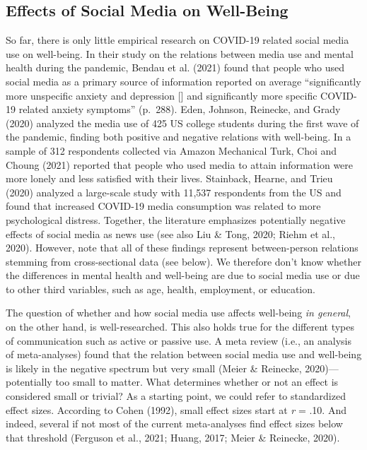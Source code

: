 \documentclass[
  english,
  man,floatsintext]{apa6}
\begin{document}
\hypertarget{effects-of-social-media-on-well-being}{%
\subsection{Effects of Social Media on Well-Being}\label{effects-of-social-media-on-well-being}}

So far, there is only little empirical research on COVID-19 related social media use on well-being.
In their study on the relations between media use and mental health during the pandemic, Bendau et al. (2021) found that people who used social media as a primary source of information reported on average ``significantly more unspecific anxiety and depression {[}{]} and significantly more specific COVID-19 related anxiety symptoms'' (p.~288).
Eden, Johnson, Reinecke, and Grady (2020) analyzed the media use of 425 US college students during the first wave of the pandemic, finding both positive and negative relations with well-being.
In a sample of 312 respondents collected via Amazon Mechanical Turk, Choi and Choung (2021) reported that people who used media to attain information were more lonely and less satisfied with their lives.
Stainback, Hearne, and Trieu (2020) analyzed a large-scale study with 11,537 respondents from the US and found that increased COVID-19 media consumption was related to more psychological distress.
Together, the literature emphasizes potentially negative effects of social media as news use (see also Liu \& Tong, 2020; Riehm et al., 2020).
However, note that all of these findings represent between-person relations stemming from cross-sectional data (see below).
We therefore don't know whether the differences in mental health and well-being are due to social media use or due to other third variables, such as age, health, employment, or education.

The question of whether and how social media use affects well-being \emph{in general}, on the other hand, is well-researched.
This also holds true for the different types of communication such as active or passive use.
A meta review (i.e., an analysis of meta-analyses) found that the relation between social media use and well-being is likely in the negative spectrum but very small (Meier \& Reinecke, 2020)---potentially too small to matter.
What determines whether or not an effect is considered small or trivial?
As a starting point, we could refer to standardized effect sizes.
According to Cohen (1992), small effect sizes start at \emph{r} = .10.
And indeed, several if not most of the current meta-analyses find effect sizes below that threshold (Ferguson et al., 2021; Huang, 2017; Meier \& Reinecke, 2020).
\end{document}
